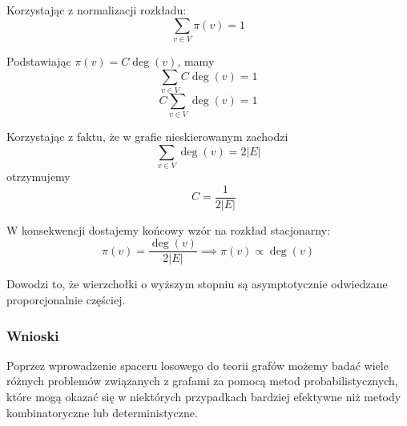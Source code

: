 Korzystając z normalizacji rozkładu:
$$\sum_{v \in V} \pi(v) = 1$$

Podstawiając $\pi(v)=C\deg(v)$, mamy
$$\sum_{v \in V} C\deg(v) = 1$$
$$ C \sum_{v \in V} \deg(v) = 1$$


Korzystając z faktu, że w grafie nieskierowanym zachodzi
$$\sum_{v \in V} \deg(v) = 2|E|$$
otrzymujemy
$$ \quad C = \frac{1}{2|E|} $$

W konsekwencji dostajemy końcowy wzór na rozkład stacjonarny:
$$\pi(v) = \frac{\deg(v)}{2|E|}  \implies \pi(v)\propto \deg(v)$$

Dowodzi to, że wierzchołki o wyższym stopniu są asymptotycznie odwiedzane proporcjonalnie częściej.

\subsubsection{Wnioski}

Poprzez wprowadzenie spaceru losowego do teorii grafów możemy badać wiele różnych problemów związanych z grafami za pomocą metod probabilistycznych, które mogą okazać się w niektórych przypadkach bardziej efektywne niż metody kombinatoryczne lub deterministyczne.